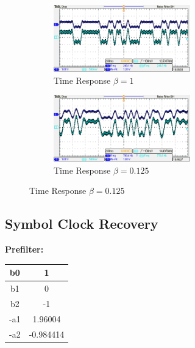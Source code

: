 \documentclass{article}
\begin{document}
\begin{figure}[h]
  \begin{center}

    \begin{subfigure}[b]{0.5\linewidth}
			\includegraphics[width=0.65\textwidth]{img/DSK_implementation_beta_1.png}
      \caption{Time Response $\beta = 1$}
    \end{subfigure}

    \begin{subfigure}[b]{0.5\linewidth}
			\includegraphics[width=0.65\textwidth]{img/DSK_implementation_beta_125.png}
      \caption{Time Response $\beta = 0.125$}
    \end{subfigure}

  \end{center}
\end{figure}

\subsection{Symbol Clock Recovery}

\textbf{Prefilter:}

\begin{center}
\begin{tabular}{c|c}
b0	&	 1				\\ \hline
b1	&  0				\\ \hline
b2	& -1				\\ \hline
-a1	&	 1.96004	\\ \hline
-a2	&	-0.984414 \\ \hline
\end{tabular}
\end{center}
\end{document}
